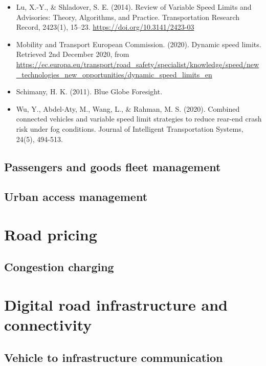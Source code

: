 \documentclass[
]{book}
\begin{document}
\begin{itemize}
\item
  Lu, X.-Y., \& Shladover, S. E. (2014). Review of Variable Speed Limits and Advisories: Theory, Algorithms, and Practice. Transportation Research Record, 2423(1), 15--23. \url{https://doi.org/10.3141/2423-03}
\item
  Mobility and Transport \textbar{} European Commission. (2020). Dynamic speed limits. Retrieved 2nd December 2020, from \url{https://ec.europa.eu/transport/road_safety/specialist/knowledge/speed/new_technologies_new_opportunities/dynamic_speed_limits_en}
\item
  Schimany, H. K. (2011). Blue Globe Foresight.
\item
  Wu, Y., Abdel-Aty, M., Wang, L., \& Rahman, M. S. (2020). Combined connected vehicles and variable speed limit strategies to reduce rear-end crash risk under fog conditions. Journal of Intelligent Transportation Systems, 24(5), 494-513.
\end{itemize}

\hypertarget{passengers-and-goods-fleet-management}{%
\section{Passengers and goods fleet management}\label{passengers-and-goods-fleet-management}}

\hypertarget{urban-access-management}{%
\section{Urban access management}\label{urban-access-management}}

\hypertarget{pricing}{%
\chapter{Road pricing}\label{pricing}}

\hypertarget{congestion-charging}{%
\section{Congestion charging}\label{congestion-charging}}

\hypertarget{digital}{%
\chapter{Digital road infrastructure and connectivity}\label{digital}}

\hypertarget{vehicle-to-infrastructure-communication}{%
\section{Vehicle to infrastructure communication}\label{vehicle-to-infrastructure-communication}}
\end{document}
